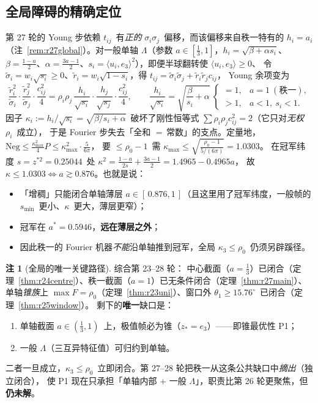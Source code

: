 \documentclass[UTF8,11pt]{ctexart}
\theoremstyle{definition}
\newtheorem{remark}[theorem]{注}
\newcommand{\Lam}{\Lambda}
\begin{document}
\subsection{全局障碍的精确定位}\label{sec:r28:global}

第 27 轮的 Young 步依赖 $t_{ij}$~有\emph{正的} $\sigma_i\sigma_j$~偏移，而该偏移来自秩一特有的 $h_i=a_i$
（注~\ref{rem:r27global}）。对一般单轴 $\Lam$（参数 $a\in[\frac13,1]$，$h_i=\sqrt{\beta+\alpha s_i}$、
$\beta=\frac{1-a}2$、$\alpha=\frac{3a-1}2$、$s_i=\langle u_i,e_3\rangle^2$），即便半球翻转使 $\langle u_i,e_3\rangle\ge0$、
令 $\widetilde\sigma_i=w_i\sqrt{s_i}\ge0$、$\widetilde r_i=w_i\sqrt{1-s_i}$，得 $t_{ij}=\widetilde\sigma_i\widetilde\sigma_j+\widetilde r_i\widetilde r_jc_{ij}$，
Young 余项变为
\begin{equation}\label{eq:r28young}
\frac{\widetilde r_i^2}{\widetilde\sigma_i}\cdot\frac{\widetilde r_j^2}{\widetilde\sigma_j}\cdot\frac{c_{ij}^2}4
=\rho_i\rho_j\,\frac{h_i}{\sqrt{s_i}}\cdot\frac{h_j}{\sqrt{s_j}}\cdot\frac{c_{ij}^2}4,
\qquad \frac{h_i}{\sqrt{s_i}}=\sqrt{\frac\beta{s_i}+\alpha}\ \begin{cases}=1,&a=1\ (\text{秩一}),\\ >1,&a<1,\ s_i<1.\end{cases}
\end{equation}
因子 $\kappa_i:=h_i/\sqrt{s_i}=\sqrt{\beta/s_i+\alpha}$~破坏了刚性恒等式
$\sum\rho_i\rho_jc_{ij}^2=2$（它只对\emph{无权} $\rho_i$~成立），
于是 Fourier 步失去「全和 $=$\,常数」的支点。定量地，
$\mathrm{Neg}\le\frac{\kappa_{\max}^2}4P\le\kappa_{\max}^2\cdot\frac5{6\pi}$，
要 $\le\rho_0-1$~需 $\kappa_{\max}\le\sqrt{\frac{\rho_0-1}{5/(6\pi)}}=1.0303$。
在冠军纬度 $s=z^{*2}=0.25044$~处 $\kappa^2=\frac{1-a}{2s}+\frac{3a-1}2=1.4965-0.4965a$，
故 $\kappa\le1.0303\iff a\gtrsim0.876$。也就是说：
\begin{itemize}\itemsep=1pt
\item 「增稠」只能闭合单轴薄层 $a\in[\,0.876,1\,]$（且这里用了冠军纬度，一般帧的 $s_{\min}$~更小、$\kappa$~更大，薄层更窄）；
\item 冠军在 $a^*=0.5946$，\textbf{远在薄层之外}；
\item 因此秩一的 Fourier 机器\emph{不能}沿单轴推到冠军，全局 $\kappa_3\le\rho_0$~仍须另辟蹊径。
\end{itemize}

\begin{remark}[全局的唯一关键路径]\label{rem:r28path}
综合第 23--28 轮：
中心截面（$a=\frac13$）已闭合（定理~\ref{thm:r24centre}）、秩一截面（$a=1$）已无条件闭合（定理~\ref{thm:r27main}）、
单轴\emph{锥族}上 $\max F=\rho_0$（定理~\ref{thm:r23uni}）、窗口外 $\theta_1\ge15.76^\circ$~已闭合（定理~\ref{thm:r25window}）。
剩下的\textbf{唯一}缺口是：
\begin{enumerate}\itemsep=1pt
\item 单轴截面 $a\in(\frac13,1)$~上，极值帧必为锥（$z_*=e_3$）——即锥最优性 P1；
\item 一般 $\Lam$（三互异特征值）可归约到单轴。
\end{enumerate}
二者一旦成立，$\kappa_3\le\rho_0$~立即闭合。第 27--28 轮把秩一从这条公共缺口中\emph{摘出}（独立闭合），
使 P1 现在只承担「单轴内部 $+$ 一般 $\Lam$」，职责比第 26 轮更聚焦，但\textbf{仍未解}。
\end{remark}
\end{document}
